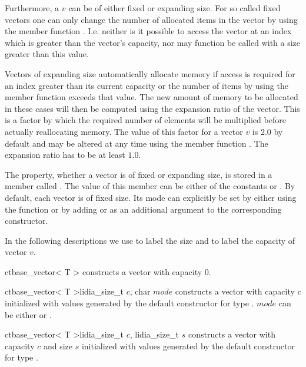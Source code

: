 Furthermore, a  $v$ can be of either fixed or expanding size.  For so called
fixed vectors one can only change the number of allocated items in the vector by using the
member function .  I.e. neither is it possible to access the vector at an
index which is greater than the vector's capacity, nor may function  be
called with a size greater than this value.

Vectors of expanding size automatically allocate memory if access is required for an index
greater than its current capacity or the number of items by using the member function
 exceeds that value.  The new amount of memory to be allocated in these cases
will then be computed using the expansion ratio of the vector.  This is a factor by which the
required number of elements will be multiplied before actually reallocating memory.  The value
of this factor for a vector $v$ is $2.0$ by default and may be altered at any time using the
member function .  The expansion ratio has to be at least $1.0$.

The property, whether a vector is of fixed or expanding size, is stored in a member called .
The value of this member can be either of the constants  or .  By
default, each vector is of fixed size.  Its mode can explicitly be set by either using the
function  or by adding  or  as an additional
argument to the corresponding constructor.

In the following descriptions we use  to label the size and 
to label the capacity of vector $v$.



\CONS

\begin{fcode}{ct}{base_vector< T >}{}
  constructs a vector with capacity $0$.
\end{fcode}

\begin{fcode}{ct}{base_vector< T >}{lidia_size_t $c$, char $\mathit{mode}$}
  constructs a vector with capacity $c$ initialized with values generated by the default
  constructor for type .  $\mathit{mode}$ can be either  or .
\end{fcode}

\begin{fcode}{ct}{base_vector< T >}{lidia_size_t $c$, lidia_size_t $s$}
  constructs a vector with capacity $c$ and size $s$ initialized with values generated by the
  default constructor for type .
\end{fcode}

